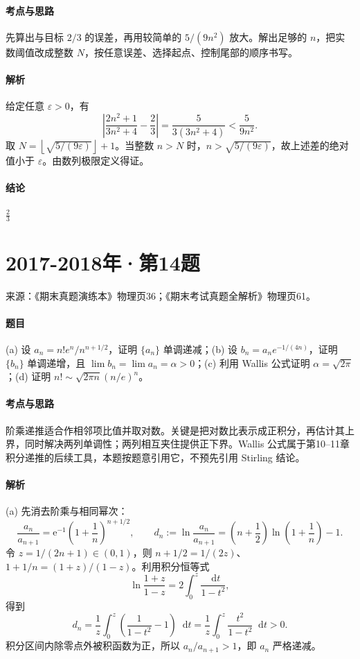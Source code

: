 \documentclass[UTF8,fontset=fandol,12pt,oneside,openany]{ctexrep}
\newcommand{\dd}{\mathop{}\!\mathrm d}
\newcommand{\ee}{\mathrm e}
\theoremstyle{definition}
\begin{document}
\paragraph{考点与思路}
先算出与目标 $2/3$ 的误差，再用较简单的 $5/(9n^2)$ 放大。解出足够的 $n$，把实数阈值改成整数 $N$，按任意误差、选择起点、控制尾部的顺序书写。

\paragraph{解析}
给定任意 $\varepsilon>0$，有 \[
\left|\frac{2n^2+1}{3n^2+4}-\frac23\right|=\frac{5}{3(3n^2+4)}<\frac{5}{9n^2}.
\]取 $N=\left\lfloor\sqrt{5/(9\varepsilon)}\right\rfloor+1$。当整数 $n>N$ 时，$n>\sqrt{5/(9\varepsilon)}$，故上述差的绝对值小于 $\varepsilon$。由数列极限定义得证。

\paragraph{结论}
$\frac23$

\par\addvspace{18pt}\noindent\begin{minipage}{\linewidth}
\section{2017-2018年·第14题}
\noindent 来源：《期末真题演练本》物理页36；《期末考试真题全解析》物理页61。

\paragraph{题目}
(a) 设 $a_n=n!e^n/n^{n+1/2}$，证明 $\{a_n\}$ 单调递减；(b) 设 $b_n=a_ne^{-1/(4n)}$，证明 $\{b_n\}$ 单调递增，且 $\lim b_n=\lim a_n=\alpha>0$；(c) 利用 Wallis 公式证明 $\alpha=\sqrt{2\pi}$；(d) 证明 $n!\sim\sqrt{2\pi n}(n/e)^n$。
\end{minipage}\par
\paragraph{考点与思路}
阶乘递推适合作相邻项比值并取对数。关键是把对数比表示成正积分，再估计其上界，同时解决两列单调性；两列相互夹住提供正下界。Wallis 公式属于第10--11章积分递推的后续工具，本题按题意引用它，不预先引用 Stirling 结论。

\paragraph{解析}
(a) 先消去阶乘与相同幂次：
\[
\frac{a_n}{a_{n+1}}
=\ee^{-1}\left(1+\frac1n\right)^{n+1/2},
\qquad
d_n:=\ln\frac{a_n}{a_{n+1}}
=\left(n+\frac12\right)\ln\left(1+\frac1n\right)-1.
\]
令 $z=1/(2n+1)\in(0,1)$，则 $n+1/2=1/(2z)$、$1+1/n=(1+z)/(1-z)$。利用积分恒等式
\[
\ln\frac{1+z}{1-z}=2\int_0^z\frac{\dd t}{1-t^2},
\]
得到
\[
d_n=\frac1z\int_0^z\left(\frac1{1-t^2}-1\right)\dd t
=\frac1z\int_0^z\frac{t^2}{1-t^2}\dd t>0.
\]
积分区间内除零点外被积函数为正，所以 $a_n/a_{n+1}>1$，即 $a_n$ 严格递减。
\end{document}
